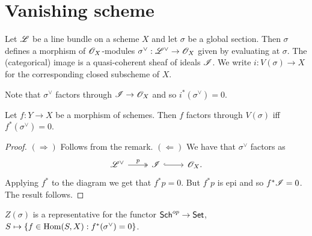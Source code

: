 \documentclass{memoir}
\begin{document}
\section{Vanishing scheme}
\begin{definition}
    Let $\mathscr{L}$ be a line bundle on a scheme $X$ and let $\sigma$ be a global section.
    Then $\sigma$ defines a morphism of $\mathscr{O}_X$-modules $\sigma^\vee:\mathscr{L}^\vee\to \mathscr{O}_X$ given by evaluating at $\sigma$.
    The (categorical) image is a quasi-coherent sheaf of ideals $\mathscr{I}$.
    We write $i:V(\sigma)\to X$ for the corresponding closed subscheme of $X$.
\end{definition}
\begin{remark}
    Note that $\sigma^\vee$ factors through $\mathscr{I}\to \mathscr{O}_X$ and so $i^*(\sigma^\vee) = 0$.
\end{remark}
\begin{proposition}
    Let $f:Y\to X$ be a morphism of schemes.
    Then $f$ factors through $V(\sigma)$ iff $f^*(\sigma^\vee) = 0$.
\end{proposition}
\begin{proof}
    $(\Rightarrow)$ Follows from the remark.
    $(\Leftarrow)$ We have that $\sigma^\vee$ factors as 
    \begin{equation}
        \begin{tikzcd}
            \shf L^\vee \arrow[r,twoheadrightarrow,"p"] & \shf I \arrow[r,hook] & \shf O_X.
        \end{tikzcd}
    \end{equation}
    Applying $f^*$ to the diagram we get that $f^*p = 0$.
    But $f^*p$ is epi and so $f^*\mathscr{I} = 0$.
    The result follows.
\end{proof}
\begin{thm}
    $Z(\sigma)$ is a representative for the functor ${\normalfont\mathsf{Sch}}^{op}\to {\normalfont\mathsf{Set}}$, $S\mapsto \lbrace f\in \operatorname{Hom}(S,X):f^*(\sigma^\vee) = 0\rbrace$.
\end{thm}
\end{document}
